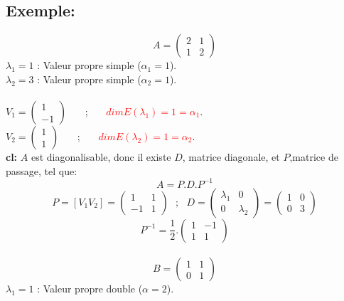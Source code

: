 \documentclass[a4paper,12pt,french]{article}
\begin{document}
	\subsection{Exemple:}
	\[A=\begin{pmatrix}
		2 & 1  \\
		1 & 2 
		
	\end{pmatrix}\]
	$\lambda_{1}=1$ : Valeur propre simple ($\alpha_{1}=1$).\\
	$\lambda_{2}=3$ : Valeur propre simple ($\alpha_{2}=1$).\\\\
	$V_{1}=\begin{pmatrix}
		1  \\
		-1  
		
	\end{pmatrix}$ ~~~;~~~ \textcolor{red}{$dim E(\lambda_{1})=1=\alpha_{1}$}.\\
	$V_{2}=\begin{pmatrix}
		1  \\
		1  
		
	\end{pmatrix}$ ~~~;~~~ \textcolor{red}{$dim E(\lambda_{2})=1=\alpha_{2}$}.\\
	\textbf{cl:} $A$ est diagonalisable, donc il existe $D$, matrice diagonale, et $P$,matrice de passage, tel que: 
	\[A=P.D.P^{-1}\]
	\[P=[V_{1} V_{2}]=\begin{pmatrix}
		1 & 1  \\
		-1 & 1 
		
	\end{pmatrix} ~~~;~~~ D=\begin{pmatrix}
		\lambda_{1} & 0  \\
		0 & \lambda_{2} 
		
	\end{pmatrix}=\begin{pmatrix}
		1 & 0  \\
		0 & 3 
		
	\end{pmatrix}\]
	\[P^{-1}=\frac{1}{2}.\begin{pmatrix}
		1 & -1  \\
		1 & 1
	\end{pmatrix} \]\\
	\[B=\begin{pmatrix}
		1 & 1  \\
		0 & 1 
		
	\end{pmatrix}\]
	$\lambda_{1}=1$ : Valeur propre double ($\alpha=2$).\\
\end{document}
